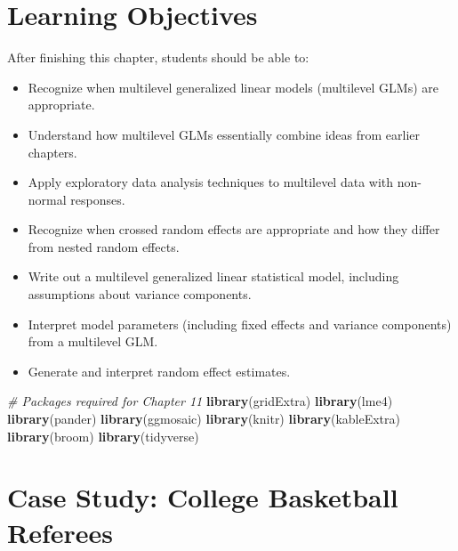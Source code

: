 \documentclass[
]{krantz}
\newenvironment{Shaded}{\begin{snugshade}}{\end{snugshade}}
\newcommand{\CommentTok}[1]{\textcolor[rgb]{0.37,0.37,0.37}{\textit{#1}}}
\newcommand{\FunctionTok}[1]{\textcolor[rgb]{0.27,0.27,0.27}{\textbf{#1}}}
\newcommand{\NormalTok}[1]{#1}
\providecommand{\tightlist}{%
  \setlength{\itemsep}{0pt}\setlength{\parskip}{0pt}}
\begin{document}
\section{Learning Objectives}\label{objectives}

After finishing this chapter, students should be able to:

\begin{itemize}
\tightlist
\item
  Recognize when multilevel generalized linear models (multilevel GLMs) are appropriate.
\item
  Understand how multilevel GLMs essentially combine ideas from earlier chapters.
\item
  Apply exploratory data analysis techniques to multilevel data with non-normal responses.
\item
  Recognize when crossed random effects are appropriate and how they differ from nested random effects.
\item
  Write out a multilevel generalized linear statistical model, including assumptions about variance components.
\item
  Interpret model parameters (including fixed effects and variance components) from a multilevel GLM.
\item
  Generate and interpret random effect estimates.
\end{itemize}

\begin{Shaded}
\begin{Highlighting}[]
\CommentTok{\# Packages required for Chapter 11}
\FunctionTok{library}\NormalTok{(gridExtra)}
\FunctionTok{library}\NormalTok{(lme4)}
\FunctionTok{library}\NormalTok{(pander)}
\FunctionTok{library}\NormalTok{(ggmosaic)}
\FunctionTok{library}\NormalTok{(knitr)}
\FunctionTok{library}\NormalTok{(kableExtra)}
\FunctionTok{library}\NormalTok{(broom)}
\FunctionTok{library}\NormalTok{(tidyverse)}
\end{Highlighting}
\end{Shaded}

\section{Case Study: College Basketball Referees}\label{cs:refs}
\end{document}

